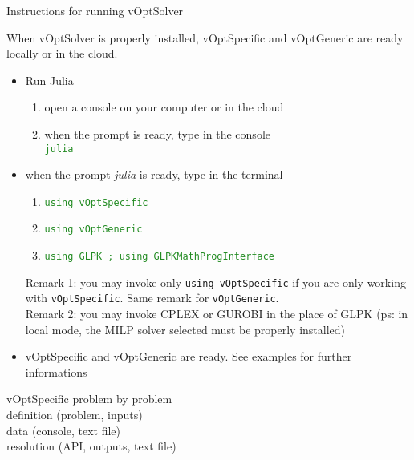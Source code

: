\documentclass[10pt,xcolor=dvipsnames]{beamer}
\newcommand{\green}{\textcolor{ForestGreen}}
\begin{document}
%
% 
\begin{frame}{Instructions for running vOptSolver}

When vOptSolver is properly installed, vOptSpecific and vOptGeneric are ready locally or in the cloud.
\medskip

\begin{itemize}
  
\item Run Julia
\begin{enumerate}
  \item open a console on your computer or in the cloud
  \item when the prompt is ready, type in the console \\
      \green{\texttt{julia}}
\end{enumerate}
  \item when the prompt \textit{julia} is ready, type in the terminal \\ 
    \begin{enumerate}
      \item    \green{\texttt{using vOptSpecific}}
      \item    \green{\texttt{using vOptGeneric}}
      \item    \green{\texttt{using GLPK ; using GLPKMathProgInterface}}            
    \end{enumerate}
    Remark 1: you may invoke only \texttt{using vOptSpecific} if you are only working with  \texttt{vOptSpecific}. Same remark for \texttt{vOptGeneric}.\\
    Remark 2: you may invoke CPLEX or GUROBI in the place of GLPK (ps: in local mode, the MILP solver selected must be properly installed)    
\medskip

\item vOptSpecific and vOptGeneric are ready. See examples for further informations

\medskip

\end{itemize}


\end{frame}

%
% 
\begin{frame}

\begin{center}
{\Large
 \textcolor[RGB]{52,57,176}{
   vOptSpecific problem by problem\\
   \vspace{5mm}
   {\small
   definition (problem, inputs) \\
   data (console, text file) \\
   resolution (API, outputs, text file) \\
   }
 }
} 
\end{center}
\end{frame}
\end{document}
